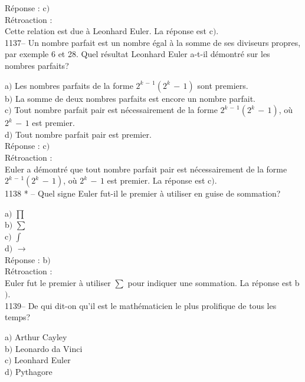 ﻿\documentclass[letterpaper, 12pt]{article}
\begin{document}
R\'eponse : c$)$\\

R\'etroaction : \\
Cette relation est due \`a {Leonhard Euler}. La r\'eponse est c$)$. \\

1137-- Un nombre parfait est un nombre \'egal \`a la somme de ses
diviseurs propres, par exemple 6 et 28. Quel r\'esultat Leonhard
Euler a-t-il d\'emontr\'e sur les nombres parfaits?

a$)$ Les nombres parfaits de la forme $2^{k\,-\,1}(2^k\,-\,1)$ sont
premiers.  \\
b$)$ La somme de deux nombres parfaits est encore un nombre parfait. \\
c$)$ Tout nombre parfait pair est n\'ecessairement de la forme
$2^{k\,-\,1}(2^k\,-\,1)$, o\`u $2^k\,-\,1$ est premier. \\
d$)$ Tout nombre parfait pair est premier. \\

R\'eponse : c$)$\\

R\'etroaction : \\
Euler a d\'emontr\'e que tout nombre parfait pair est
n\'ecessairement de la forme $2^{k\,-\,1}(2^k\,-\,1)$, o\`u
$2^k\,-\,1$ est premier.
La r\'eponse est c$)$.\\

1138 * -- Quel signe Euler fut-il le premier \`a utiliser en guise
de sommation?

a$)$ $\prod$ \\[1mm]
b$)$ $\sum$  \\[1mm]
c$)$ $\int$   \\[1mm]
d$)$ $\to$  \\

R\'eponse : b$)$\\

R\'etroaction : \\
Euler fut le premier \`a utiliser $\sum$ pour indiquer une sommation. La
r\'eponse est b$)$. \\

1139-- De qui dit-on qu'il est le math\'ematicien le plus prolifique
de tous les temps?

a$)$ Arthur Cayley \\
b$)$ Leonardo da Vinci  \\
c$)$ Leonhard Euler   \\
d$)$ Pythagore  \\
\end{document}
